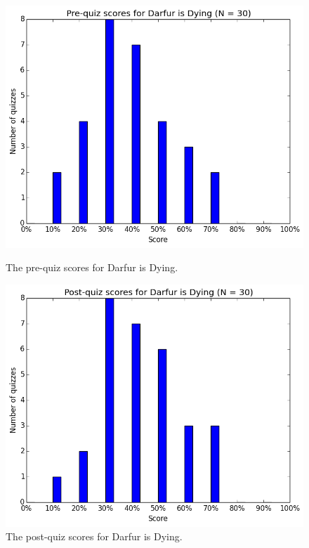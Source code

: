 			\begin{figure}[] 
			\centering 
			\begin{minipage}[b]{0.45\linewidth}
			\includegraphics[width=\textwidth]{darfur_pre.png} 
			\caption{The pre-quiz scores for Darfur is Dying.}
			\end{minipage}
			\quad
			\begin{minipage}[b]{0.45\linewidth}
			\includegraphics[width=\textwidth]{darfur_post.png} 
			\caption{The post-quiz scores for Darfur is Dying.}
			\end{minipage}
			\end{figure}

